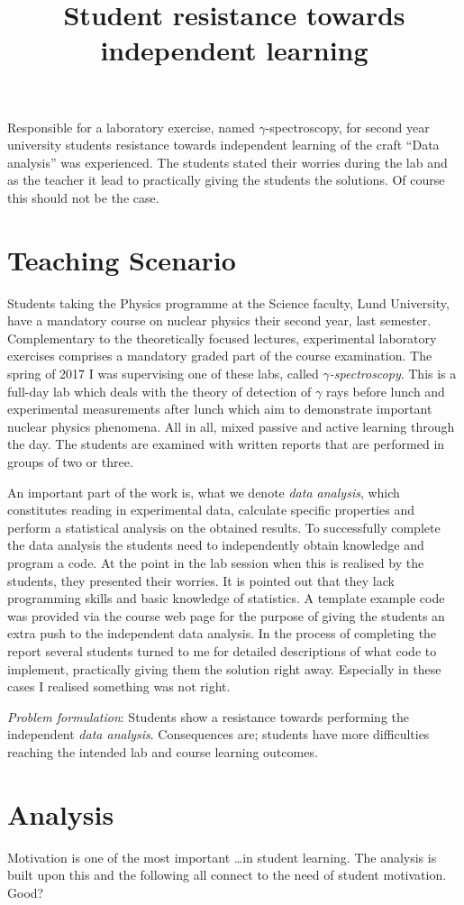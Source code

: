 \documentclass[]{article}
\title{Student resistance towards independent learning}
\begin{document}
Responsible for a laboratory exercise, named $\gamma$-spectroscopy, for second year university students resistance towards independent learning of the craft ``Data analysis'' was experienced. The students stated their worries during the lab and as the teacher it lead to practically giving the students the solutions. Of course this should not be the case.

\section*{Teaching Scenario}
Students taking the Physics programme at the Science faculty, Lund University, have a mandatory course on nuclear physics their second year, last semester.
Complementary to the theoretically focused lectures, experimental laboratory exercises comprises a mandatory graded part of the course examination.
The spring of 2017 I was supervising one of these labs, called {\it $\gamma$-spectroscopy}.
This is a full-day lab which deals with the theory of detection of $\gamma$ rays before lunch and experimental measurements after lunch which aim to demonstrate important nuclear physics phenomena.
All in all, mixed passive and active learning through the day.
The students are examined with written reports that are performed in groups of two or three.


An important part of the work is, what we denote {\it data analysis}, which constitutes reading in experimental data, calculate specific properties and perform a statistical analysis on the obtained results.
To successfully complete the data analysis the students need to independently obtain knowledge and program a code.
At the point in the lab session when this is realised by the students, they presented their worries.
It is pointed out that they lack programming skills and basic knowledge of statistics.
A template example code was provided via the course web page for the purpose of giving the students an extra push to the independent data analysis.
In the process of completing the report several students turned to me for detailed descriptions of what code to implement, practically giving them the solution right away.
Especially in these cases I realised something was not right.

{\it Problem formulation}: Students show a resistance towards performing the independent {\it data analysis}. Consequences are; students have more difficulties reaching the intended lab and course learning outcomes.


\section*{Analysis}
Motivation is one of the most important \dots in student learning.
The analysis is built upon this and the following all connect to the need of student motivation.
Good?
\end{document}
